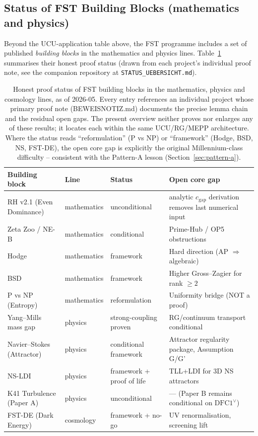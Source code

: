 \documentclass[11pt,a4paper]{article}
\theoremstyle{remark}
\begin{document}
\subsection{Status of FST Building Blocks (mathematics and physics)}
\label{subsec:building-blocks}

Beyond the UCU-application table above, the FST programme includes a
set of published \emph{building blocks} in the mathematics and physics
lines. Table~\ref{tab:building-blocks} summarises their honest proof
status (drawn from each project's individual proof note, see the
companion repository at \texttt{STATUS\_UEBERSICHT.md}).

\begin{table}[h]
\centering
\renewcommand{\arraystretch}{1.18}
\small
\begin{tabular}{p{2.8cm}p{2.0cm}p{2.5cm}p{4.3cm}}
\toprule
\textbf{Building block} & \textbf{Line} & \textbf{Status} &
\textbf{Open core gap} \\
\midrule
RH v2.1 (Even Dominance) & mathematics & unconditional & analytic
$c_{\text{gap}}$ derivation removes last numerical input \\
Zeta Zoo / NE-B          & mathematics & conditional   & Prime-Hub /
OP5 obstructions \\
Hodge                    & mathematics & framework     & Hard direction
(AP $\Rightarrow$ algebraic) \\
BSD                      & mathematics & framework     & Higher
Gross--Zagier for rank $\ge 2$ \\
P vs NP (Entropy)        & mathematics & reformulation & Uniformity
bridge (NOT a proof) \\
\midrule
Yang--Mills mass gap     & physics     & strong-coupling proven &
RG/continuum transport conditional \\
Navier--Stokes (Attractor) & physics   & conditional framework &
Attractor regularity package, Assumption G/G' \\
NS-LDI                   & physics     & framework + proof of life &
TLL+LDI for 3D NS attractors \\
K41 Turbulence (Paper A) & physics     & unconditional & --- (Paper B
remains conditional on $\mathrm{DFC1}^{\vee}$) \\
\midrule
FST-DE (Dark Energy)     & cosmology   & framework + no-go &
UV renormalisation, screening lift \\
\bottomrule
\end{tabular}
\caption{Honest proof status of FST building blocks in the
mathematics, physics and cosmology lines, as of 2026-05. Every entry
references an individual project whose primary proof note (BEWEISNOTIZ.md)
documents the precise lemma chain and the residual open gaps. The
present overview neither proves nor enlarges any of these results;
it locates each within the same UCU/RG/MEPP architecture. Where the
status reads ``reformulation'' (P vs NP) or ``framework'' (Hodge,
BSD, NS, FST-DE), the open core gap is explicitly the original
Millennium-class difficulty -- consistent with the Pattern-A lesson
(Section~\ref{sec:pattern-a}).}
\label{tab:building-blocks}
\end{table}
\end{document}
